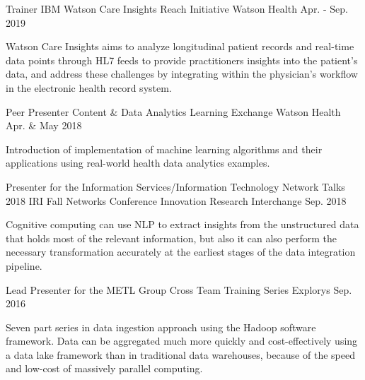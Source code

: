 

\begin{cventries}

  \cventry
    {Trainer} %
    {IBM Watson Care Insights Reach Initiative} %
    {Watson Health} %
    {Apr. - Sep. 2019} %
    {
      \begin{cvcompactparagraph}
        Watson Care Insights aims to analyze longitudinal patient records and real-time data points through HL7 feeds to provide practitioners insights into the patient’s data, and address these challenges by integrating within the physician's workflow in the electronic health record system.
      \end{cvcompactparagraph}
    }

  \cventry
    {Peer Presenter} %
    {Content \& Data Analytics Learning Exchange} %
    {Watson Health} %
    {Apr. \& May 2018} %
    {
      \begin{cvcompactparagraph}
        Introduction of implementation of machine learning algorithms and their applications using real-world health data analytics examples.
      \end{cvcompactparagraph}
    }

  \cventry
    {Presenter for the Information Services/Information Technology Network Talks} %
    {2018 IRI Fall Networks Conference} %
    {Innovation Research Interchange} %
    {Sep. 2018} %
    {
      \begin{cvcompactparagraph}
        Cognitive computing can use NLP to extract insights from the unstructured data that holds most of the relevant information, but also it can also perform the necessary transformation accurately at the earliest stages of the data integration pipeline.
      \end{cvcompactparagraph}
    }

  \cventry
    {Lead Presenter for the METL Group} %
    {Cross Team Training Series} %
    {Explorys} %
    {Sep. 2016} %
    {
      \begin{cvcompactparagraph}
        Seven part series in data ingestion approach using the Hadoop software framework.  Data can be aggregated much more quickly and cost-effectively using a data lake framework than in traditional data warehouses, because of the speed and low-cost of massively parallel computing.
      \end{cvcompactparagraph}
    }

\end{cventries}
